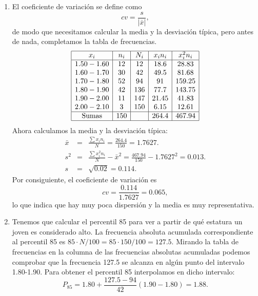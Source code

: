 {\begin{enumerate}
\item  El coeficiente de variación se define como
\[
cv=\dfrac{s}{|\bar{x}|},
\]
de modo que necesitamos calcular la media y la desviación típica, pero antes de nada, completamos la tabla de frecuencias.
\[
\begin{array}{|c|c|c|c|c|}
\hline
x_{i} & n_{i} & N_{i} & x_{i}n_{i} & x_{i}^2n_{i}\\ \hline
1.50-1.60 & 12 & 12 & 18.6 & 28.83 \\
1.60-1.70 & 30 & 42 & 49.5 & 81.68 \\
1.70-1.80 & 52 & 94 & 91 & 159.25\\
1.80-1.90 & 42 & 136 & 77.7 & 143.75\\
1.90-2.00 & 11 & 147 & 21.45 & 41.83\\
2.00-2.10 & 3 & 150 & 6.15 & 12.61\\ \hline
\mbox{Sumas} & 150 & & 264.4 & 467.94 \\
\hline
\end{array}
\]
Ahora calculamos la media y la desviación típica:
\begin{eqnarray*}
\bar{x} & = & \frac{\sum
x_{i}n_{i}}{N}=\frac{264.4}{150}=1.7627.\\
s^2 & = & \frac{\sum x_{i}^2 n_{i}}{N}-\bar{x}^2 =
\frac{467.94}{150}-1.7627^2=0.013.\\
s & = & \sqrt{0.02}=0.114.
\end{eqnarray*}
Por consiguiente, el coeficiente de variación es
\[ cv=\frac{0.114}{1.7627}=0.065, \]
lo que indica que hay muy poca dispersión y la media es muy representativa.

\item Tenemos que calcular el percentil 85 para ver a partir de qué estatura un joven es considerado alto.
La frecuencia absoluta acumulada correspondiente al percentil 85 es $85\cdot N/100=85\cdot 150/100 = 127.5$.
Mirando la tabla de frecuencias en la columna de las frecuencias absolutas acumuladas podemos comprobar que la frecuencia 127.5 se alcanza en algún punto del intervalo 1.80-1.90.
Para obtener el percentil 85 interpolamos en dicho intervalo:
\[ P_{85}=1.80+\frac{127.5-94}{42}(1.90-1.80)=1.88. \]
\end{enumerate}
}


